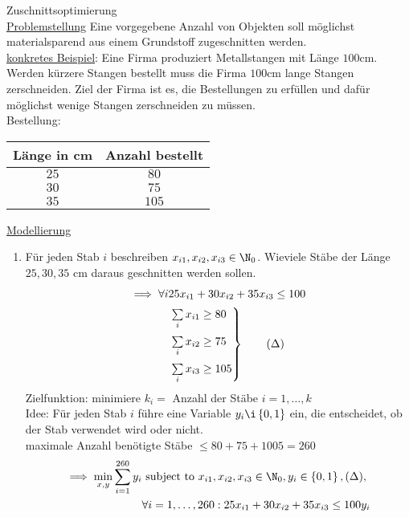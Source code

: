 \begin{beispiel}
	Zuschnittsoptimierung\\
  	\underline{Problemstellung} Eine vorgegebene Anzahl von Objekten soll möglichst materialsparend aus einem Grundstoff zugeschnitten werden.\\
  	\underline{konkretes Beispiel}: Eine Firma produziert Metallstangen mit Länge $100$cm. Werden kürzere Stangen bestellt muss die Firma $100$cm lange Stangen zerschneiden. Ziel der Firma ist es, die Bestellungen zu erfüllen und dafür möglichst wenige Stangen zerschneiden zu müssen.\\
  	Bestellung:
	\begin{table}[H]
		\centering
		\begin{tabular}{c|c}
			Länge in cm & Anzahl bestellt}\\
      		\hline
      		$25$ & $80$ \\
      		$30$ & $75$ \\
      		$35$ & $105$ \\
  		\end{tabular}
	\end{table}
	\underline{Modellierung} 
	\begin{enumerate}
		\item Für jeden Stab $i$ beschreiben $x_{i1},x_{i2},x_{i3} \in \N_{0}$. Wieviele Stäbe der Länge $25,30,35$ cm daraus geschnitten werden sollen.
			\begin{align*}\label{model_cutting_1}
				\implies \forall i & 25x_{i1} + 30x_{i2} + 35x_{i3}\leq 100\\
								   &
								   \begin{rcases}
								   		 \sum\limits_{i}^{} x_{i1} \geq 80\\
								   		 \sum\limits_{i}^{} x_{i2} \geq 75\\
								   		 \sum\limits_{i}^{} x_{i3} \geq 105 
									 \end{rcases} \tag{$\Delta$}
			\end{align*}
			Zielfunktion: minimiere $k_{i}=$ Anzahl der Stäbe $i = 1,\dots ,k$\\
			Idee: Für jeden Stab $i$ führe eine Variable $y_{i} \i \left\{0,1 \right\}$ ein, die entscheidet, ob der Stab verwendet wird oder nicht.\\
			maximale Anzahl benötigte Stäbe $\leq 80 + 75 +1005 = 260$ 
			\begin{align*}
				\implies \min_{x,y}\sum_{i=1}^{260} y_{i} &\text{ subject to } x_{i1},x_{i2},x_{i3} \in \N_{0}, y_{i}\in \left\{0,1 \right\} , (\Delta),\\
				& \forall i = 1,\dots ,260 : 25x_{i1} + 30x_{i2} + 35x_{i3} \leq 100y_{i}
			\end{align*}
			

\end{enumerate}
\end{beispiel}
